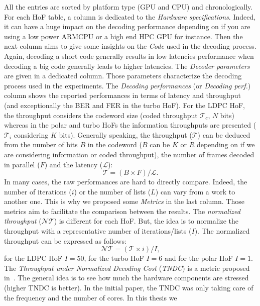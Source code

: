 \newpage
All the entries are sorted by platform type (GPU and CPU) and chronologically.
For each HoF table, a column is dedicated to the \emph{Hardware specifications}.
Indeed, it can have a huge impact on the decoding performance depending on if
you are using a low power ARM\R CPU or a high end HPC GPU for instance. Then the
next column aims to give some insights on the \emph{Code} used in the decoding
process. Again, decoding a short code generally results in low latencies
performance when decoding a big code generally leads to higher latencies. The
\emph{Decoder parameters} are given in a dedicated column. Those parameters
characterize the decoding process used in the experiments. The \emph{Decoding
performances} (or \emph{Decoding perf.}) column shows the reported performances
in terms of latency and throughput (and exceptionally the BER and FER in the
turbo HoF). For the LDPC HoF, the throughput considers the codeword size (coded
throughput $\mathcal{T}_c$, $N$ bits) whereas in the polar and turbo HoFs the
information throughputs are presented ($\mathcal{T}_i$ considering $K$ bits).
Generally speaking, the throughput ($\mathcal{T}$) can be deduced from the
number of bits $B$ in the codeword ($B$ can be $K$ or $R$ depending on if we are
considering information or coded throughput), the number of frames decoded in
parallel ($F$) and the latency ($\mathcal{L}$):
\begin{equation}
  \mathcal{T} = (B \times F) / \mathcal{L}.
\end{equation}
In many cases, the raw performances are hard to directly compare. Indeed, the
number of iterations ($i$) or the number of lists ($L$) can vary from a work to
another one. This is why we proposed some \emph{Metrics} in the last column. Those
metrics aim to facilitate the comparison between the results. The
\emph{normalized throughput} ($\mathcal{NT}$) is different for each HoF. But,
the idea is to normalize the throughput with a representative number of
iterations/lists ($I$). The normalized throughput can be expressed as follows:
\begin{equation}
  \mathcal{NT} = (\mathcal{T} \times i) / I,
\end{equation}
for the LDPC HoF $I = 50$, for the turbo HoF $I = 6$ and for the polar HoF
$I = 1$.
The \emph{Throughput under Normalized Decoding Cost} (\emph{TNDC}) is a metric
proposed in~\cite{Ying2012}. The general idea is to see how much the hardware
components are stressed (higher TNDC is better). In the initial paper, the TNDC
was only taking care of the frequency and the number of cores. In this thesis we
